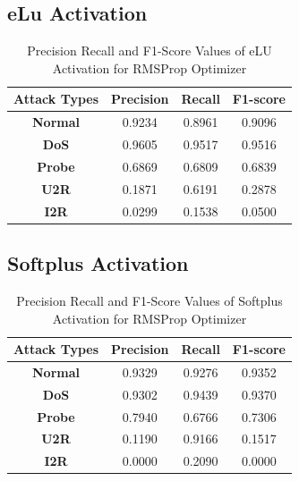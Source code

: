 \documentclass[12pt, a4paper]{report}
\begin{document}
\begin{appendices}
	\subsection{eLu Activation}
 	  \begin{table}[h]
		\centering
		\captionsetup{justification=centering,margin=2cm}
		\begin{tabular}{|c|c|c|c|}
		\hline
		\textbf{Attack Types} & \textbf{Precision} & \textbf{Recall} & \textbf{F1-score} \\ \hline
		\textbf{Normal}       & 0.9234             & 0.8961          & 0.9096            \\ \hline
		\textbf{DoS}          & 0.9605             & 0.9517          & 0.9516            \\ \hline
		\textbf{Probe}        & 0.6869             & 0.6809          & 0.6839            \\ \hline
		\textbf{U2R}          & 0.1871             & 0.6191          & 0.2878            \\ \hline
		\textbf{I2R}          & 0.0299             & 0.1538          & 0.0500            \\ \hline
		\end{tabular}
		\caption{Precision Recall and F1-Score Values of eLU Activation for RMSProp Optimizer}
		\label{classification elu rms tflearn}
		\end{table} 
	
	\subsection{Softplus Activation}
 	  \begin{table}[h]
		\centering
		\captionsetup{justification=centering,margin=2cm}
		\begin{tabular}{|c|c|c|c|}
		\hline
		\textbf{Attack Types} & \textbf{Precision} & \textbf{Recall} & \textbf{F1-score} \\ \hline
		\textbf{Normal}       & 0.9329             & 0.9276          & 0.9352            \\ \hline
		\textbf{DoS}          & 0.9302             & 0.9439          & 0.9370            \\ \hline
		\textbf{Probe}        & 0.7940             & 0.6766          & 0.7306            \\ \hline
		\textbf{U2R}          & 0.1190             & 0.9166          & 0.1517            \\ \hline
		\textbf{I2R}          & 0.0000             & 0.2090          & 0.0000            \\ \hline
		\end{tabular}
		\caption{Precision Recall and F1-Score Values of Softplus Activation for RMSProp Optimizer}
		\label{classification softplus rms tflearn}
		\end{table} 
		\clearpage

\end{appendices}
\end{document}

